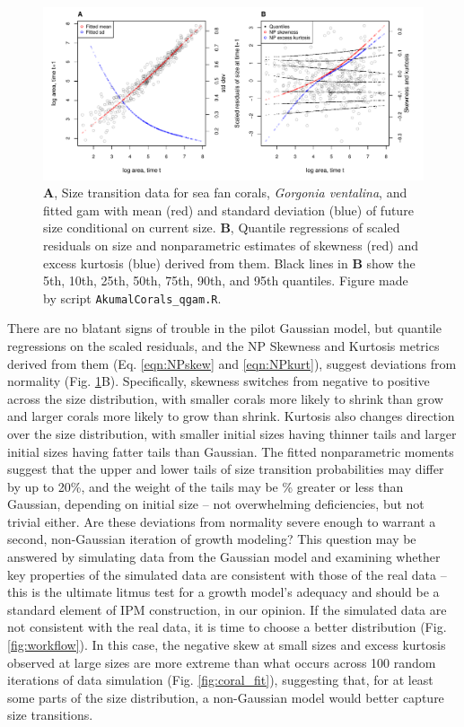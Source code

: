 \documentclass[12pt]{article}
\begin{document}
\begin{figure}[tbp]
	\centering
	\includegraphics[width=1.0\textwidth]{figures/coral_qgam_diagnostics.pdf}
	\caption{\textbf{A}, Size transition data for sea fan corals, \emph{Gorgonia ventalina}, and fitted gam with mean (red) and standard deviation (blue) of future size conditional on current size.  \textbf{B}, Quantile regressions of scaled residuals on size and nonparametric estimates of skewness (red) and excess kurtosis (blue) derived from them. Black lines in \textbf{B} show the 5th, 10th, 25th, 50th, 75th, 90th, and 95th quantiles. Figure made by script \texttt{AkumalCorals\_qgam.R}.}
	\label{fig:coral_diganostics}
\end{figure} 

There are no blatant signs of trouble in the pilot Gaussian model, but quantile regressions on the scaled residuals, and the NP Skewness and Kurtosis metrics derived from them (Eq. \ref{eqn:NPskew} and \ref{eqn:NPkurt}), suggest deviations from normality (Fig. \ref{fig:coral_diganostics}B).
Specifically, skewness switches from negative to positive across the size distribution, with smaller corals more likely to shrink than grow and larger corals more likely to grow than shrink. 
Kurtosis also changes direction over the size distribution, with smaller initial sizes having thinner tails and larger initial sizes having fatter tails than Gaussian. 
The fitted nonparametric moments suggest that the upper and lower tails of size transition probabilities may differ by up to 20\%, and the weight of the tails may be \% greater or less than Gaussian, depending on initial size -- not overwhelming deficiencies, but not trivial either. 
Are these deviations from normality severe enough to warrant a second, non-Gaussian iteration of growth modeling? 
This question may be answered by simulating data from the Gaussian model and examining whether key properties of the simulated data are consistent with those of the real data -- this is the ultimate litmus test for a growth model's adequacy and should be a standard element of IPM construction, in our opinion.
If the simulated data are not consistent with the real data, it is time to choose a better distribution (Fig. \ref{fig:workflow}). 
In this case, the negative skew at small sizes and excess kurtosis observed at large sizes are more extreme than what occurs across 100 random iterations of data simulation (Fig. \ref{fig:coral_fit}), suggesting that, for at least some parts of the size distribution, a non-Gaussian model would better capture size transitions. 
\end{document}
